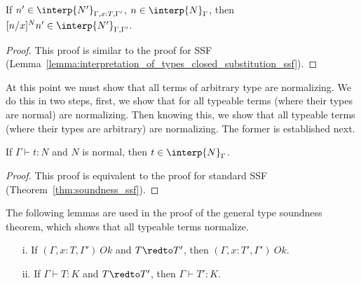 \begin{lemma}
  If $n' \in \interp{N'}_{\Gamma,x:T,\Gamma'}$, $n \in \interp{N}_\Gamma$, then 
  $[n/x]^N n' \in \interp{N'}_{\Gamma,\Gamma'}$.
  
  \label{lemma:interpretation_of_types_closed_substitution_stlc}
\end{lemma}
\begin{proof}
  This proof is similar to the proof for SSF
  (Lemma~\ref{lemma:interpretation_of_types_closed_substitution_ssf}).
\end{proof}
At this point we must show that all terms of arbitrary type are
normalizing. We do this in two steps, first, we show that for all
typeable terms (where their types are normal) are normalizing.  Then
knowing this, we show that all typeable terms (where their types are
arbitrary) are normalizing. The former is established next.
\begin{thm}
  If $\Gamma \vdash t:N$ and $N$ is normal, then $t \in \interp{N}_\Gamma$.
  \label{thm:soundness__normal_ssfw}
\end{thm}
\begin{proof}
  This proof is equivalent to the proof for standard SSF
  (Theorem~\ref{thm:soundness_ssf}).
\end{proof}
\noindent
The following lemmas are used in the proof of the general type
soundness theorem, which shows that all typeable terms normalize.
\begin{lemma}
  \label{lemma:preservation_for_kinding_ssfw}
  \begin{itemize}
  \item[i.] If $(\Gamma,x:T,\Gamma')\ Ok$ and $T \redto T'$, then $(\Gamma,x:T',\Gamma')\ Ok$.
  \item[ii.] If $\Gamma \vdash T:K$ and $T \redto T'$, then $\Gamma \vdash T':K$.
  \end{itemize}
\end{lemma}
